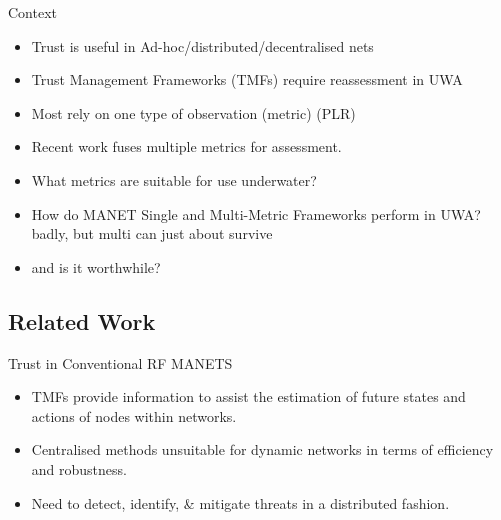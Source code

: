 \documentclass[aspectratio=169]{beamer}
\begin{document}
\begin{frame}{Context}

  \begin{itemize}
    \item
	  Trust is useful in Ad-hoc/distributed/decentralised nets
    \item
      Trust Management Frameworks (TMFs) require reassessment in UWA
    \item 
      Most rely on one type of observation (metric) (PLR)
    \item 
      Recent work\autocite{Guo11} fuses multiple metrics for assessment.
      \pause
    \item
      What metrics are suitable for use underwater?
    \item 
      How do MANET Single and Multi-Metric Frameworks perform in UWA? \autocite{Bolster2015}\pause \alert{ badly}\pause \alert{, but multi can just about survive}\pause
    \item
      \pause \alert{ and is it worthwhile?}
  \end{itemize}
\end{frame}



\subsection{Related Work}

\begin{frame}{Trust in Conventional RF MANETS}
  \begin{itemize}
    \item 
      TMFs provide information to assist the estimation of future states and actions of nodes within networks.
    \item
      Centralised methods unsuitable for dynamic networks in terms of efficiency and robustness\autocite{Caiti2011}.
    \item 
      Need to detect, identify, \& mitigate threats in a distributed fashion.
  \end{itemize}
\end{frame}
\end{document}
